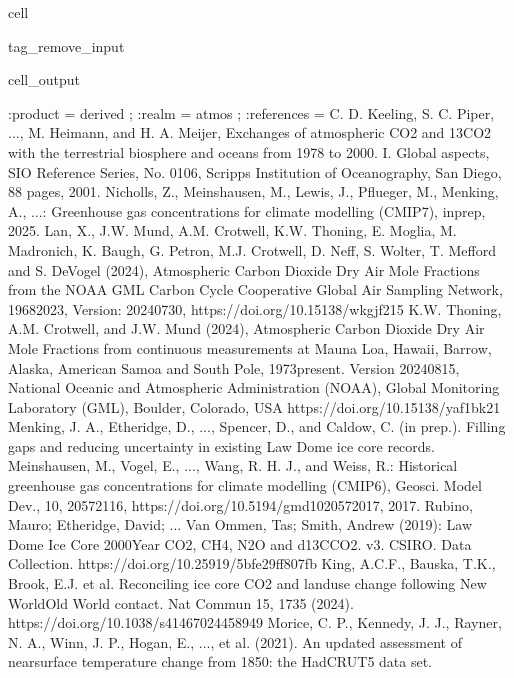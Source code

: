 \documentclass[letterpaper,10pt,english]{jupyterBook}
\begin{document}
\begin{sphinxuseclass}{cell}
\begin{sphinxuseclass}{tag_remove_input}
\begin{sphinxVerbatimOutput}
\begin{sphinxuseclass}{cell_output}
\begin{sphinxVerbatim}[commandchars=\\\{\}]
		:product = \PYGZdq{}derived\PYGZdq{} ;
		:realm = \PYGZdq{}atmos\PYGZdq{} ;
		:references = \PYGZdq{}C. D. Keeling, S. C. Piper, ..., M. Heimann, and
H. A. Meijer, Exchanges of atmospheric CO2 and 13CO2 with the terrestrial
biosphere and  oceans from 1978 to 2000. I. Global aspects, SIO Reference
Series, No. 01\PYGZhy{}06, Scripps Institution of Oceanography, San Diego, 88 pages,
2001. \PYGZhy{}\PYGZhy{}\PYGZhy{} Nicholls, Z., Meinshausen, M., Lewis, J., Pflueger, M., Menking, A.,
...: Greenhouse gas concentrations for climate modelling (CMIP7), in\PYGZhy{}prep,
2025. \PYGZhy{}\PYGZhy{}\PYGZhy{} Lan, X., J.W. Mund, A.M. Crotwell, K.W. Thoning, E. Moglia, M.
Madronich, K. Baugh, G. Petron, M.J. Crotwell, D. Neff, S. Wolter, T. Mefford
and S. DeVogel (2024), Atmospheric Carbon Dioxide Dry Air Mole Fractions from
the NOAA GML Carbon Cycle Cooperative Global Air Sampling Network, 1968\PYGZhy{}2023,
Version: 2024\PYGZhy{}07\PYGZhy{}30, https://doi.org/10.15138/wkgj\PYGZhy{}f215 \PYGZhy{}\PYGZhy{}\PYGZhy{} K.W. Thoning, A.M.
Crotwell, and J.W. Mund (2024), Atmospheric Carbon Dioxide Dry Air Mole
Fractions from continuous measurements at Mauna Loa, Hawaii, Barrow, Alaska,
American Samoa and South Pole, 1973\PYGZhy{}present. Version 2024\PYGZhy{}08\PYGZhy{}15, National
Oceanic and Atmospheric Administration (NOAA), Global Monitoring Laboratory
(GML), Boulder, Colorado, USA https://doi.org/10.15138/yaf1\PYGZhy{}bk21 \PYGZhy{}\PYGZhy{}\PYGZhy{} Menking,
J. A., Etheridge, D., ..., Spencer, D., and Caldow, C. (in prep.). Filling gaps
and reducing uncertainty in existing Law Dome ice core records. \PYGZhy{}\PYGZhy{}\PYGZhy{}
Meinshausen, M., Vogel, E., ..., Wang, R. H. J., and Weiss, R.: Historical
greenhouse gas concentrations for climate modelling (CMIP6), Geosci. Model
Dev., 10, 2057\PYGZhy{}2116, https://doi.org/10.5194/gmd\PYGZhy{}10\PYGZhy{}2057\PYGZhy{}2017, 2017. \PYGZhy{}\PYGZhy{}\PYGZhy{}
Rubino, Mauro; Etheridge, David; ... Van Ommen, Tas; \PYGZam{} Smith, Andrew (2019):
Law Dome Ice Core 2000\PYGZhy{}Year CO2, CH4, N2O and d13C\PYGZhy{}CO2. v3. CSIRO. Data
Collection. https://doi.org/10.25919/5bfe29ff807fb \PYGZhy{}\PYGZhy{}\PYGZhy{} King, A.C.F., Bauska,
T.K., Brook, E.J. et al. Reconciling ice core CO2 and land\PYGZhy{}use change following
New World\PYGZhy{}Old World contact. Nat Commun 15, 1735 (2024).
https://doi.org/10.1038/s41467\PYGZhy{}024\PYGZhy{}45894\PYGZhy{}9 \PYGZhy{}\PYGZhy{}\PYGZhy{} Morice, C. P., Kennedy, J. J.,
Rayner, N. A., Winn, J. P., Hogan, E., ..., et al. (2021). An updated
assessment of near\PYGZhy{}surface temperature change from 1850: the HadCRUT5 data set.

\end{sphinxVerbatim}
\end{sphinxuseclass}
\end{sphinxVerbatimOutput}
\end{sphinxuseclass}
\end{sphinxuseclass}
\end{document}

